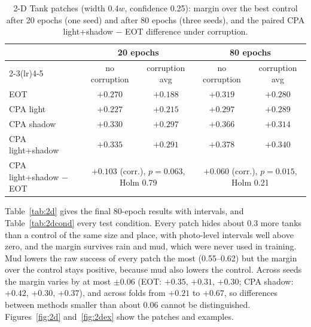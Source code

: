 \documentclass[11pt,a4paper]{article}
\begin{document}
\begin{table}[htbp]
\centering\small
\caption{2-D Tank patches (width $0.4w$, confidence 0.25): margin over the best control after 20 epochs (one seed) and after 80 epochs (three seeds), and the paired CPA light+shadow $-$ EOT difference under corruption.}
\label{tab:2dconv}
\setlength{\tabcolsep}{4pt}
\begin{tabular}{@{}lcccc@{}}
\toprule
 & \multicolumn{2}{c}{20 epochs} & \multicolumn{2}{c}{80 epochs} \\
\cmidrule(lr){2-3}\cmidrule(lr){4-5}
 & no corruption & corruption avg & no corruption & corruption avg \\
\midrule
EOT & $+0.270$ & $+0.188$ & $+0.319$ & $+0.280$ \\
CPA light & $+0.227$ & $+0.215$ & $+0.297$ & $+0.289$ \\
CPA shadow & $+0.330$ & $+0.297$ & $+0.366$ & $+0.314$ \\
CPA light+shadow & $+0.335$ & $+0.291$ & $+0.378$ & $+0.340$ \\
\midrule
CPA light+shadow $-$ EOT & \multicolumn{2}{c}{$+0.103$ (corr.), $p=0.063$, Holm 0.79} & \multicolumn{2}{c}{$+0.060$ (corr.), $p=0.015$, Holm 0.21} \\
\bottomrule
\end{tabular}
\end{table}

Table~\ref{tab:2d} gives the final 80-epoch results with intervals, and Table~\ref{tab:2dcond} every test condition. Every patch hides about 0.3 more tanks than a control of the same size and place, with photo-level intervals well above zero, and the margin survives rain and mud, which were never used in training. Mud lowers the raw success of every patch the most (0.55--0.62) but the margin over the control stays positive, because mud also lowers the control. Across seeds the margin varies by at most $\pm0.06$ (EOT: $+0.35$, $+0.31$, $+0.30$; CPA shadow: $+0.42$, $+0.30$, $+0.37$), and across folds from $+0.21$ to $+0.67$, so differences between methods smaller than about 0.06 cannot be distinguished. Figures~\ref{fig:2d} and~\ref{fig:2dex} show the patches and examples.
\end{document}
